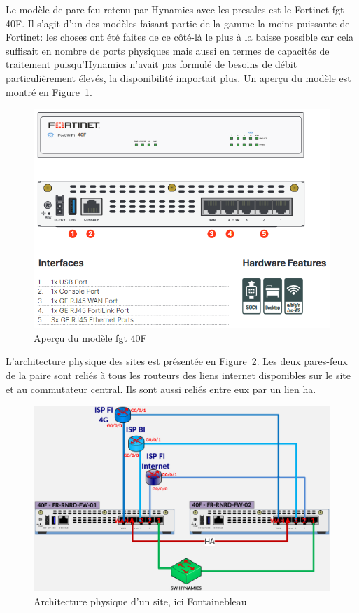 \documentclass[12pt, oneside, a4paper, titlepage]{report}
\begin{document}
Le modèle de pare-feu retenu par Hynamics avec les \gls{presales} est le
Fortinet \acrlong{fgt} 40F. Il s'agit d'un des modèles faisant partie de la
gamme la moins puissante de Fortinet: les choses ont été faites de ce côté-là le
plus à la baisse possible car cela suffisait en nombre de ports physiques mais
aussi en termes de capacités de traitement puisqu'Hynamics n'avait pas formulé
de besoins de débit particulièrement élevés, la disponibilité importait plus.
Un aperçu du modèle est montré en Figure~\ref{fig:doc-hy/fgt-40f}.

\begin{figure}[h!]
    \centering
    \includegraphics[width = 0.8\linewidth]{img/doc-hy/fgt-40f.png}
    \caption{Aperçu du modèle \acrlong{fgt} 40F}%
    \label{fig:doc-hy/fgt-40f}
\end{figure}

L'architecture physique des sites est présentée en
Figure~\ref{fig:doc-hy/site-phys-arch}. Les deux pares-feux de la paire sont
reliés à tous les routeurs des liens internet disponibles sur le site et au
commutateur central. Ils sont aussi reliés entre eux par un lien \gls{ha}.

\begin{figure}[h!]
    \centering
    \includegraphics[width = 0.8\linewidth]{img/doc-hy/site-phys-arch.png}
    \caption{Architecture physique d'un site, ici Fontainebleau}%
    \label{fig:doc-hy/site-phys-arch}
\end{figure}
\end{document}
